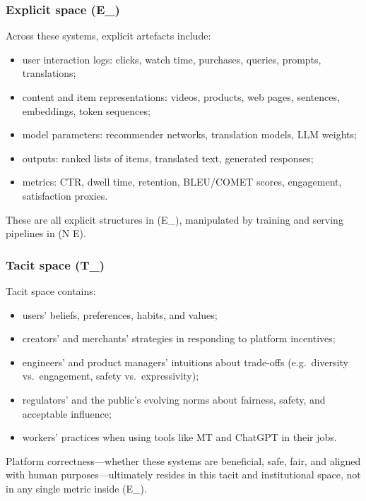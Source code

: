 \subsubsection*{Explicit space (E_{})}

Across these systems, explicit artefacts include:

\begin{itemize}
\item user interaction logs:
clicks, watch time, purchases, queries, prompts, translations;
\item content and item representations:
videos, products, web pages, sentences, embeddings, token sequences;
\item model parameters:
recommender networks, translation models, LLM weights;
\item outputs:
ranked lists of items, translated text, generated responses;
\item metrics:
CTR, dwell time, retention, BLEU/COMET scores, engagement,
satisfaction proxies.
\end{itemize}

These are all explicit structures in (E_{}), manipulated
by training and serving pipelines in (N \ltimes E).

\subsubsection*{Tacit space (T_{})}

Tacit space contains:

\begin{itemize}
\item users’ beliefs, preferences, habits, and values;
\item creators’ and merchants’ strategies in responding to platform
incentives;
\item engineers’ and product managers’ intuitions about trade-offs
(e.g.\ diversity vs.\ engagement, safety vs.\ expressivity);
\item regulators’ and the public’s evolving norms about fairness, safety,
and acceptable influence;
\item workers’ practices when using tools like MT and ChatGPT in their
jobs.
\end{itemize}

Platform correctness---whether these systems are beneficial, safe, fair, and
aligned with human purposes---ultimately resides in this tacit and
institutional space, not in any single metric inside (E_{}).

